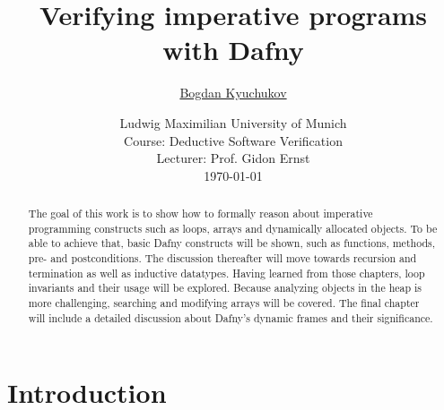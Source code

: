 \documentclass[a4paper]{article}
\begin{document}
\title{
	\vspace{1cm}
	\Huge Verifying imperative programs \\ with Dafny \\
}

\vspace{1cm}

\author{\Large \href{mailto:B.Kyuchukov@campus.lmu.de}{Bogdan Kyuchukov}
	\vspace{1cm}}

\date{
	\large Ludwig Maximilian University of Munich \\ Course: Deductive Software Verification \\
	\vspace{0.8cm}
	\large Lecturer: Prof. Gidon Ernst\\
	\vspace{1cm}
	\today
}

\maketitle
\setlength{\parindent}{0pt}

\vspace{2cm}
\begin{abstract}
	The goal of this work is to show how to formally reason
	about imperative programming constructs such as
	loops, arrays and dynamically allocated objects. To be able to achieve that, basic
	Dafny constructs will be shown, such as functions, methods, pre- and postconditions. The discussion thereafter will move
	towards recursion and termination as well as inductive datatypes. Having learned from those chapters,
	loop invariants and their usage will be explored. Because analyzing objects in the heap is more challenging,
	searching and modifying arrays will be covered. The final chapter will include a detailed discussion about Dafny's
	dynamic frames and their significance.
\end{abstract}
\newpage
\tableofcontents
\newpage

\section{Introduction}
\label{sec:introduction}
\end{document}
